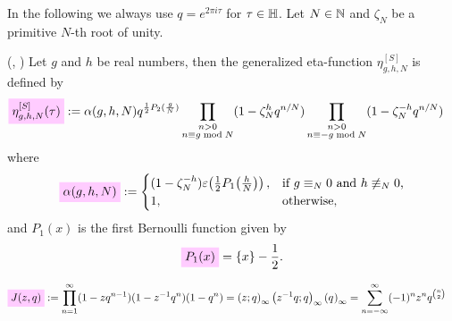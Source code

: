 \documentclass{article}
\begin{document}
In the following we always use $q = e^{2\pi i \tau}$ for $\tau \in
\mathbb{H}$.
%
Let $N \in \mathbb{N}$ and $\zeta_N$ be a primitive $N$-th root of unity.

\begin{Definition}
  \label{eq:def:eta_g-h^[S](tau)}
  (\cite{Schoeneberg_EllipticModularFunctions_1974},
  \cite[p.~672]{Yang_GeneralizedDedekindEtaFunctions_2004})
  Let $g$ and $h$ be
  real numbers, then the generalized eta-function $\eta_{g,h,N}^{[S]}$
  is defined by
\begin{align}
  \defineNotation[eta-g-h-N-tau-Schoeneberg]{\eta_{g,h,N}^{[S]}(\tau)}
  &:=
  \alpha(g,h,N) q^{\frac{1}{2} P_2(\frac{g}{N})}
  \prod_{\substack{n>0\\n\equiv g \bmod N}}
       (1-\zeta_N^h q^{n/N})
  \prod_{\substack{n>0\\n\equiv -g \bmod N}}
       (1-\zeta_N^{-h} q^{n/N})
  \label{eq:def:eta_g-h-N^[S](tau)}
\end{align}
where
\begin{gather}
  \defineNotation[alpha-g-h-N]{\alpha(g,h,N)}
  :=
  \begin{cases}
    (1 - \zeta_N^{-h}) \unityPower{\frac{1}{2} P_1\!\left(\frac{h}{N}\right)},
    &
    \text{if $g\equiv_N 0$ and $h\not\equiv_N 0$,}
    \\
    1, & \text{otherwise},
  \end{cases}
  \label{eq:eta_g-h-N^[S](tau)-prefactor}
\end{gather}
and $P_1(x)$ is the first Bernoulli function given by
\begin{gather*}
  \defineNotation[P-1]{P_1(x)}
  =
  \{x\} - \frac{1}{2}.
\end{gather*}
\end{Definition}


\begin{Definition}
  \label{def:Jacobi-triple-product}
\begin{align}
  \defineNotation[J-z-q]{\jacobiFunction{z}{q}}
  &:=
    \prod_{n=1}^\infty (1-z q^{n-1}) (1-z^{-1}q^n) (1-q^n)
  = \qPochhammer{z}{q} \qPochhammer{z^{-1}q}{q} \eulerFunction{}
  = \sum_{n=-\infty}^\infty (-1)^n z^n q^{\binom{n}{2}}
  \label{eq:Jacobi-triple-product}
\end{align}
\end{Definition}
\end{document}
